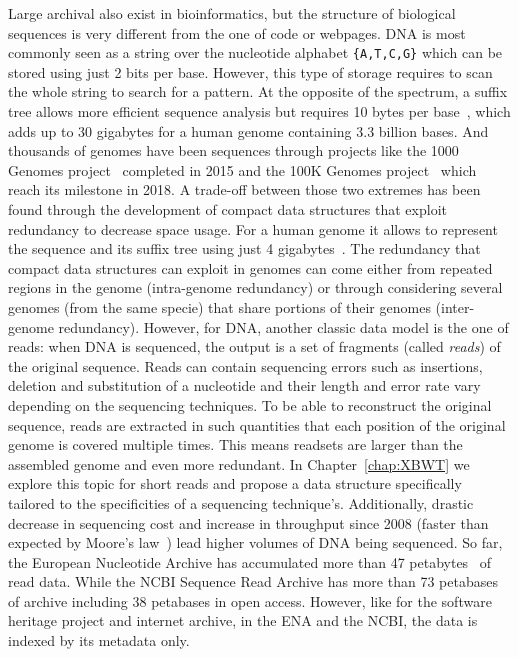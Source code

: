 Large archival also exist in bioinformatics, but the structure of biological sequences is very different from the one of code or webpages.
DNA is most commonly seen as a string over the nucleotide alphabet \texttt{\{A,T,C,G\}} which can be stored using just 2 bits per base. However, this type of storage requires to scan the whole string to search for a pattern. 
At the opposite of the spectrum, a suffix tree allows more efficient sequence analysis but requires 10 bytes per base~\cite{navarro2016compact}, which adds up to 30 gigabytes for a human genome containing 3.3 billion bases. 
And thousands of genomes have been sequences through projects like the 1000 Genomes project~\cite{10002015global} completed in 2015 and the 100K Genomes project~\cite{100Kgenomes} which reach its milestone in 2018. 
A trade-off between those two extremes has been found through the development of compact data structures that exploit redundancy to decrease space usage. For a human genome it allows to represent the sequence and its suffix tree using just 4 gigabytes~\cite{navarro2016compact}.
The redundancy that compact data structures can exploit in genomes can come either from repeated regions in the genome (intra-genome redundancy) or through considering several genomes (from the same specie) that share portions of their genomes (inter-genome redundancy).  
However, for DNA, another classic data model is the one of reads: when DNA is sequenced, the output is a set of fragments (called \emph{reads}) of the original sequence. Reads can contain sequencing errors such as insertions, deletion and substitution of a nucleotide and their length and error rate vary depending on the sequencing techniques. To be able to reconstruct the original sequence, reads are extracted in such quantities that each position of the original genome is covered multiple times. This means readsets are larger than the assembled genome and even more redundant. In Chapter~\ref{chap:XBWT} we explore this topic for short reads and propose a data structure specifically tailored to the specificities of a sequencing technique's. 
Additionally, drastic decrease in sequencing cost and increase in throughput since 2008 (faster than expected by Moore's law~\cite{muir2016real}) lead higher volumes of DNA being sequenced. 
So far, the European Nucleotide Archive has accumulated more than 47 petabytes~\cite{ena} of read data.
While the NCBI Sequence Read Archive has more than 73 petabases~\cite{sra} of archive including 38 petabases in open access. However, like for the software heritage project and internet archive, in the ENA and the NCBI, the data is indexed by its metadata only.\\

